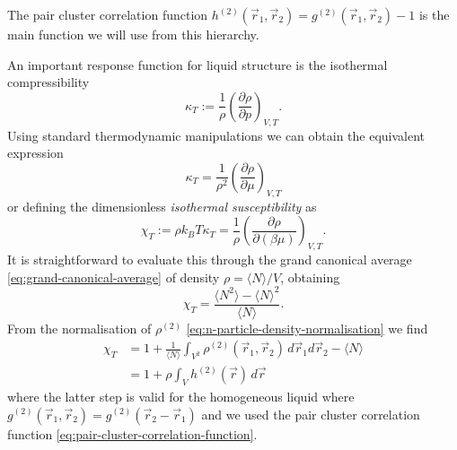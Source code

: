 The pair cluster correlation function%
$h^{(2)}(\vec{r}_1, \vec{r}_2) = g^{(2)}(\vec{r}_1, \vec{r}_2) - 1$ is the main function we will use from this hierarchy.

An important response function for liquid structure is the isothermal compressibility
\begin{equation*}\label{eq:isothermal-compressibility}
  \kappa_T
  :=
  \frac{1}{\rho}
  \left( \frac{\partial \rho}{\partial p} \right)_{V,T}.
\end{equation*}
Using standard thermodynamic manipulations we can obtain the equivalent expression \begin{equation*}
  \kappa_T
  =
  \frac{1}{\rho^2}
  \left( \frac{\partial \rho}{\partial \mu} \right)_{V,T}
\end{equation*}
or defining the dimensionless \emph{isothermal susceptibility} as \begin{equation*}\label{eq:isothermal-susceptibility}
  \chi_T
  :=
  \rho k_B T \kappa_T
  =
  \frac{1}{\rho}
  \left( \frac{\partial \rho}{\partial (\beta \mu)} \right)_{V,T}.
\end{equation*}
It is straightforward to evaluate this through the grand canonical average \eqref{eq:grand-canonical-average} of density $\rho = \langle N \rangle / V$, obtaining
\begin{equation}
  \chi_T
  =
  \frac{ \langle N^2 \rangle - \langle N \rangle^2 }{\langle N \rangle}.
\end{equation}
From the normalisation of $\rho^{(2)}$ \eqref{eq:n-particle-density-normalisation} we find
\begin{equation}\label{eq:compressibility-h2}
  \begin{split}
    \chi_T
    &=
    1
    + \frac{1}{\langle N \rangle}
    \int_{V^2} \rho^{(2)}(\vec{r}_1, \vec{r}_2) \, d\vec{r}_1 d\vec{r}_2
    - \langle N \rangle
    \\ &=
    1
    + \rho \int_V h^{(2)}(\vec{r}) \, d\vec{r}
  \end{split}
\end{equation}
where the latter step is valid for the homogeneous liquid where $g^{(2)}(\vec{r}_1, \vec{r}_2) = g^{(2)}(\vec{r}_2 - \vec{r}_1)$ and we used the pair cluster correlation function \eqref{eq:pair-cluster-correlation-function}.

